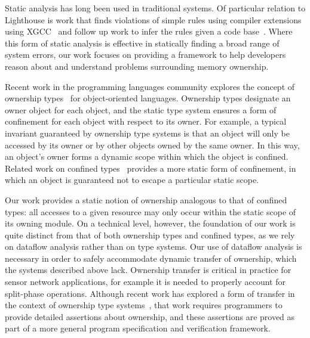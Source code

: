 Static analysis has long been used in traditional systems.
%
Of particular relation to Lighthouse is work that finds violations of simple
rules using compiler extensions using XGCC~\cite{engler00programmer} and
follow up work to infer the rules given a code base~\cite{kremenek06from}.
%
Where this form of static analysis is effective in statically finding a broad
range of system errors, our work focuses on providing a framework to help
developers reason about and understand problems surrounding memory
ownership.
%



Recent work in the programming languages community explores the concept of
ownership types~\cite{ownership,ownership2,BoyapatiEtAl02,aliasjava} for
object-oriented languages. 
%
Ownership types designate an owner object for each object, and the static
type system ensures a form of confinement for each object with respect to
its owner.  
%
For example, a typical invariant guaranteed by ownership type systems is
that an object will only be accessed by its owner or by other objects owned
by the same owner.  
%
In this way, an object's owner forms a dynamic scope within which the object
is confined.  
%
Related work on confined types~\cite{confined1,confined2} provides a more
static form of confinement, in which an object is guaranteed not to escape a
particular static scope.



Our work provides a static notion of ownership analogous to that of confined
types:  all accesses to a given resource may only occur within the static
scope of its owning module.  
%
On a technical level, however, the foundation of our work is quite distinct
from that of both ownership types and confined types, as we rely on dataflow
analysis rather than on type systems.  
%
Our use of dataflow analysis is necessary in order to safely accommodate
dynamic transfer of ownership, which the systems described above lack.  
%
Ownership transfer is critical in practice for sensor network applications,
for example it is needed to properly account for split-phase operations.  
%
Although recent work has explored a form of transfer in the context of
ownership type systems~\cite{DBLP:conf/ecoop/BanerjeeN05}, that work
requires programmers to provide detailed assertions about ownership, and
these assertions are proved as part of a more general program specification
and verification framework.



